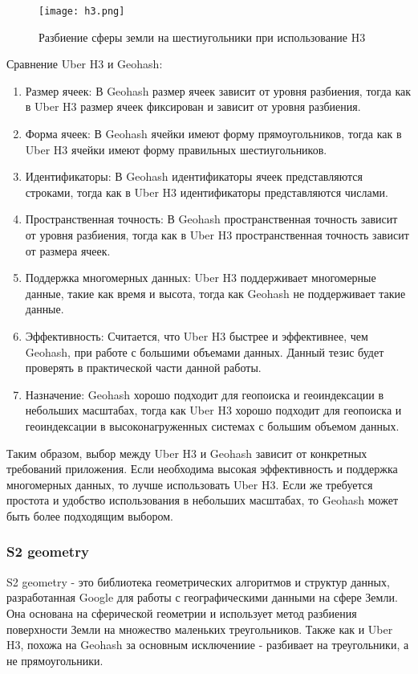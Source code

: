 \begin{figure}[h]
    \centering
    \texttt{[image: h3.png]}
    \caption{Разбиение сферы земли на шестиугольники при использование H3}
\end{figure}

Сравнение Uber H3 и Geohash:
\begin{enumerate}
    \item Размер ячеек: В Geohash размер ячеек зависит от уровня разбиения, тогда как в Uber H3 размер ячеек фиксирован и зависит от уровня разбиения.
    \item Форма ячеек: В Geohash ячейки имеют форму прямоугольников, тогда как в Uber H3 ячейки имеют форму правильных шестиугольников.
    \item Идентификаторы: В Geohash идентификаторы ячеек представляются строками, тогда как в Uber H3 идентификаторы представляются числами.
    \item Пространственная точность: В Geohash пространственная точность зависит от уровня разбиения, тогда как в Uber H3 пространственная точность зависит от размера ячеек.
    \item Поддержка многомерных данных: Uber H3 поддерживает многомерные данные, такие как время и высота, тогда как Geohash не поддерживает такие данные.
    \item Эффективность: Считается, что Uber H3 быстрее и эффективнее, чем Geohash, при работе с большими объемами данных. Данный тезис будет проверять в практической части данной работы.
    \item Назначение: Geohash хорошо подходит для геопоиска и геоиндексации в небольших масштабах, тогда как Uber H3 хорошо подходит для геопоиска и геоиндексации в высоконагруженных системах с большим объемом данных.
\end{enumerate}

Таким образом, выбор между Uber H3 и Geohash зависит от конкретных требований приложения. Если необходима высокая эффективность и поддержка многомерных данных, то лучше использовать Uber H3. Если же требуется простота и удобство использования в небольших масштабах, то Geohash может быть более подходящим выбором.

\subsubsection{S2 geometry}

S2 geometry - это библиотека геометрических алгоритмов и структур данных, разработанная Google для работы с географическими данными на сфере Земли. Она основана на сферической геометрии и использует метод разбиения поверхности Земли на множество маленьких треугольников. Также как и Uber H3, похожа на Geohash за основным исключениие - разбивает на треугольники, а не прямоугольники.

